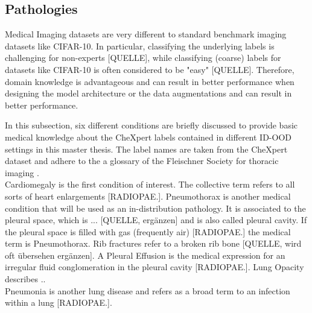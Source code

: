 \subsection{Pathologies}
Medical Imaging datasets are very different to standard benchmark imaging datasets like CIFAR-10.
In particular, classifying the underlying labels is challenging for non-experts [QUELLE], while classifying (coarse) labels for datasets like CIFAR-10 is often considered to be "easy" [QUELLE].
Therefore, domain knowledge is advantageous and can result in better performance when designing the model architecture or the data augmentations and can result in better performance.
\par
In this subsection, six different conditions are briefly discussed to provide basic medical knowledge about the CheXpert labels contained in different ID-OOD settings in this master thesis.
The label names are taken from the CheXpert dataset \citep{Irvin2019} and adhere to the a glossary of the Fleischner Society for thoracic imaging \citep{Hansell2008}.
\\
Cardiomegaly is the first condition of interest. The collective term refers to all sorts of heart enlargements [RADIOPAE.].
Pneumothorax is another medical condition that will be used as an in-distribution pathology.
It is associated to the pleural space, which is ... [QUELLE, ergänzen] and is also called pleural cavity.
If the pleural space is filled with gas (frequently air) [RADIOPAE.] the medical term is Pneumothorax.
Rib fractures refer to a broken rib bone [QUELLE, wird oft übersehen ergänzen].
A Pleural Effusion is the medical expression for an irregular fluid conglomeration in the pleural cavity [RADIOPAE.].
Lung Opacity describes .. \\
Pneumonia is another lung disease and refers as a broad term to an infection within a lung [RADIOPAE.]. 
